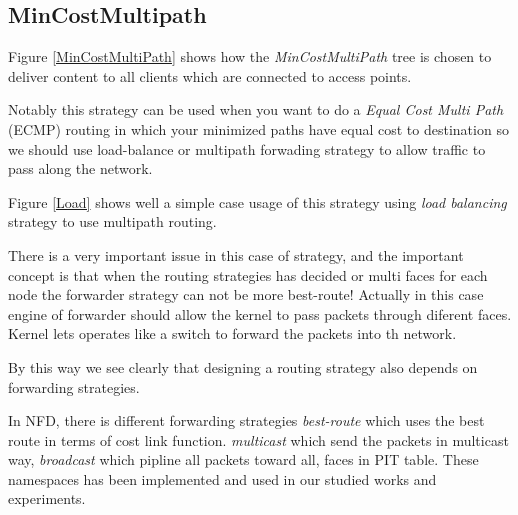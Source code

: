 \subsection{MinCostMultipath}
Figure \ref{MinCostMultiPath} shows how the \textit{MinCostMultiPath} tree is chosen to deliver content to all clients which are connected to access points.
 
Notably this strategy can be used when you want to do a \textit{Equal Cost Multi Path} (ECMP) routing in which your minimized paths have equal cost to destination so we should use load-balance or multipath forwading strategy to allow traffic to pass along the network. 

Figure \ref{Load} shows well a simple case usage of this strategy using \textit{load balancing} strategy to use multipath routing.

There is a very important issue in this case of strategy, and the important concept is that when the routing strategies has decided or multi faces for each node the forwarder strategy can not be more best-route! Actually in this case engine of forwarder should allow the kernel to pass packets through diferent faces. Kernel lets operates like a switch to forward the packets into th network.

By this way we see clearly that designing a routing strategy also depends on forwarding strategies. 

In NFD, there is different forwarding strategies \textit{best-route} which uses the best route in terms of cost link function. \textit{multicast} which send the packets in multicast way, \textit{broadcast} which pipline all packets toward all, faces in PIT table. These namespaces has been implemented and used in our studied works and experiments.

